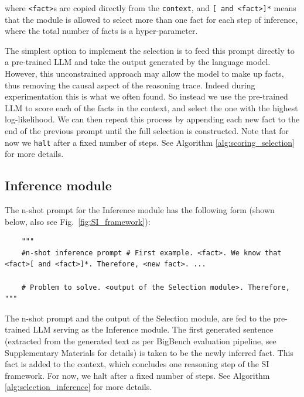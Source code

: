 where \verb|<fact>|s are copied directly from the \verb|context|, and \verb|[ and <fact>]*| means that the module is allowed to select more than one fact for each step of inference, where the total number of facts is a hyper-parameter. 

The simplest option to implement the selection is to feed this prompt directly to a pre-trained LLM and take the output generated by the language model. However, this unconstrained approach may allow the model to make up facts, thus removing the causal aspect of the reasoning trace. Indeed during experimentation this is what we often found. So instead we use the pre-trained LLM to score each of the facts in the context, and select the one with the highest log-likelihood. We can then repeat this process by appending each new fact to the end of the previous prompt until the full selection is constructed. Note that for now we \texttt{halt} after a fixed number of steps. See Algorithm \ref{alg:scoring_selection} for more details.

\subsection{Inference module} \label{sec:inference}

The n-shot prompt for the Inference module has the following form (shown below, also see Fig.~\ref{fig:SI_framework}):

\begin{small}\begin{lstlisting}
    """
    #n-shot inference prompt # First example. <fact>. We know that <fact>[ and <fact>]*. Therefore, <new fact>. ...

    # Problem to solve. <output of the Selection module>. Therefore, """
\end{lstlisting}\end{small}

The n-shot prompt and the output of the Selection module, are fed to the pre-trained LLM serving as the Inference module. The first generated sentence (extracted from the generated text as per BigBench evaluation \citep{BigBench} pipeline, see Supplementary Materials for details) is taken to be the newly inferred fact. This fact is added to the context, which concludes one reasoning step of the SI framework. For now, we halt after a fixed number of steps. See Algorithm \ref{alg:selection_inference} for more details.

